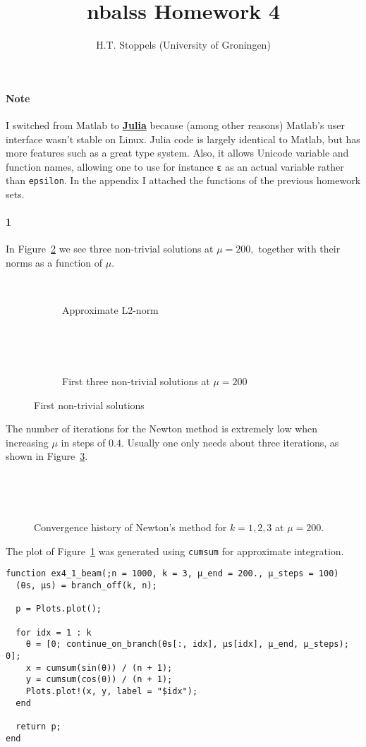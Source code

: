 \documentclass[a4paper]{article}
\author{H.T. Stoppels (University of Groningen)}
\title{{\sc nbalss} Homework 4}
\begin{document}
  \maketitle 

  \paragraph{Note} I switched from Matlab to \href{http://julialang.org/blog/2017/03/julia-fresh-paper}{\bf Julia} because (among other reasons) Matlab's user interface wasn't stable on Linux. Julia code is largely identical to Matlab, but has more features such as a great type system. Also, it allows Unicode variable and function names, allowing one to use for instance {\tt ɛ} as an actual variable rather than {\tt epsilon}. In the appendix I attached the functions of the previous homework sets.

  \paragraph{1} In Figure~\ref{fig:solutions} we see three non-trivial solutions at $\mu = 200,$ together with their norms as a function of $\mu.$

  \begin{figure}[h]
    \begin{subfigure}[b]{0.5\textwidth}
      ~
      \caption{Approximate L2-norm}
    \end{subfigure}
    \begin{subfigure}[b]{0.5\textwidth}
      ~
      \caption{First three non-trivial solutions at $\mu = 200$}~
      \label{fig:beam_sol}
    \end{subfigure}
    \caption{First non-trivial solutions}
    \label{fig:solutions}
  \end{figure}

  \noindent The number of iterations for the Newton method is extremely low when increasing $\mu$ in steps of $0.4.$ Usually one only needs about three iterations, as shown in Figure~\ref{fig:newton_at_mu_500}.

  \begin{figure}[h]
    \centering
    ~
    \caption{Convergence history of Newton's method for $k = 1, 2, 3$ at $\mu = 200.$}~
    \label{fig:newton_at_mu_500}
  \end{figure}

  \noindent The plot of Figure~\ref{fig:beam_sol} was generated using {\tt cumsum} for approximate integration.
\begin{verbatim}
function ex4_1_beam(;n = 1000, k = 3, μ_end = 200., μ_steps = 100)
  (θs, μs) = branch_off(k, n);

  p = Plots.plot();

  for idx = 1 : k
    θ = [0; continue_on_branch(θs[:, idx], μs[idx], μ_end, μ_steps); 0];
    x = cumsum(sin(θ)) / (n + 1);
    y = cumsum(cos(θ)) / (n + 1);
    Plots.plot!(x, y, label = "$idx");
  end

  return p;
end
\end{verbatim}
\end{document}
